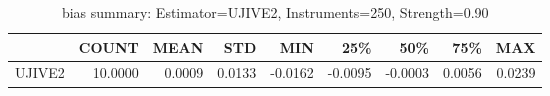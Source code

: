 \begin{table}[ht]
\centering
\caption{bias summary: Estimator=UJIVE2, Instruments=250, Strength=0.90}
\begin{tabular}{lrrrrrrrr}
\toprule
 & COUNT & MEAN & STD & MIN & 25\% & 50\% & 75\% & MAX \\
\midrule
UJIVE2 & 10.0000 & 0.0009 & 0.0133 & -0.0162 & -0.0095 & -0.0003 & 0.0056 & 0.0239 \\
\bottomrule
\end{tabular}
\end{table}
